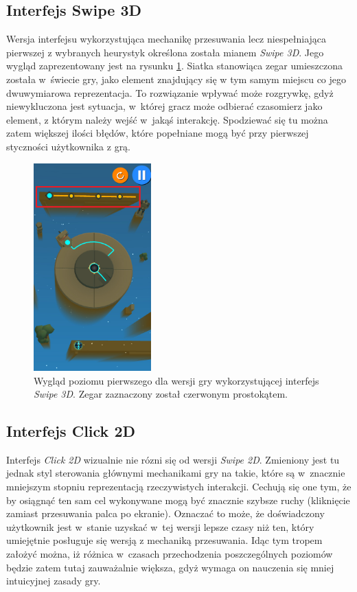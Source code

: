 \documentclass[a4paper,12pt,numbers=noenddot]{report}
\begin{document}
\subsection{Interfejs Swipe 3D}
Wersja interfejsu wykorzystująca mechanikę przesuwania lecz niespełniająca pierwszej z wybranych heurystyk określona została mianem \textit{Swipe 3D}. Jego wygląd zaprezentowany jest na rysunku \ref{fig:interface_Swipe_3d}. Siatka stanowiąca zegar umieszczona została w~świecie gry, jako element znajdujący się w tym samym miejscu co jego dwuwymiarowa reprezentacja. To rozwiązanie wpływać może rozgrywkę, gdyż niewykluczona jest sytuacja, w~której gracz może odbierać czasomierz jako element, z którym  należy wejść w~jakąś interakcję. Spodziewać się tu można zatem większej ilości błędów, które popełniane mogą być przy pierwszej styczności użytkownika z grą.
\begin{figure}[h!]
	\centering
  	\includegraphics[height=8cm]{fig/timer_3d.jpg}
	\caption{Wygląd poziomu pierwszego dla wersji gry wykorzystującej interfejs \textit{Swipe 3D}. Zegar zaznaczony został czerwonym prostokątem.}
	\label{fig:interface_Swipe_3d}
\end{figure}
\subsection{Interfejs Click 2D}
Interfejs \textit{Click 2D} wizualnie nie rózni się od wersji \textit{Swipe 2D}. Zmieniony jest tu jednak styl sterowania głównymi mechanikami gry na takie, które są w~znacznie mniejszym stopniu reprezentacją rzeczywistych interakcji. Cechują się one tym, że by osiągnąć ten sam cel wykonywane mogą być znacznie szybsze ruchy (kliknięcie zamiast przesuwania palca po ekranie). Oznaczać to może, że doświadczony użytkownik jest w~stanie uzyskać w~tej wersji lepsze czasy niż ten, który umiejętnie posługuje się wersją z mechaniką przesuwania. Idąc tym tropem założyć można, iż różnica w~czasach przechodzenia poszczególnych poziomów będzie zatem tutaj zauważalnie większa, gdyż wymaga on nauczenia się mniej intuicyjnej zasady gry.
\end{document}

